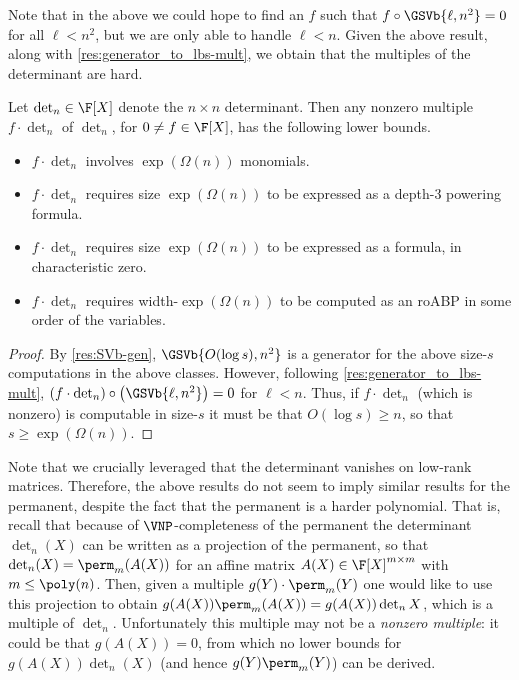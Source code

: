 \documentclass{toc}
\begin{document}
Note that in the above we could hope to find an $f$ such that $f\circ \GSVb{\ell,n^2}=0$ for all $\ell<n^2$, but we are only able to handle $\ell<n$. Given the above result, along with \autoref{res:generator_to_lbs-mult}, we obtain that the multiples of the determinant are hard.

\begin{corollary}\label{res:lbs-mult:pit:det}
        Let $\det_n\in\F[X]$ denote the $n\times n$ determinant.  Then any nonzero multiple $f\cdot \det_n$ of $\det_n$, for $0 \ne f\in\F[X]$, has the following lower bounds.
        \begin{itemize}
                \item $f\cdot \det_n$ involves $\exp(\Omega(n))$ monomials.
                \item $f\cdot \det_n$ requires size $\exp(\Omega(n))$ to be expressed as a depth-$3$ powering formula.
                \item $f\cdot \det_n$ requires size $\exp(\Omega(n))$ to be expressed as a \sumpowc formula, in characteristic zero.
                \item $f\cdot \det_n$ requires width-$\exp(\Omega(n))$ to be computed as an roABP in some order of the variables.
        \end{itemize}
\end{corollary}
\begin{proof}
        By \autoref{res:SVb-gen}, $\GSVb{O(\log s),n^2}$ is a generator for the above size-$s$ computations in the above classes.  However, following \autoref{res:generator_to_lbs-mult}, $(f\cdot\det_n)\circ \left(\GSVb{\ell,n^2}\right)=0$ for $\ell<n$.  Thus, if $f\cdot \det_n$ (which is nonzero) is computable in size-$s$ it must be that $O(\log s)\ge n$, so that $s\ge\exp(\Omega(n))$.
\end{proof}

Note that we crucially leveraged that the determinant vanishes on low-rank matrices.  Therefore, %
the above results do not seem to imply similar results for the permanent, despite the fact that the permanent is a harder polynomial. That is, recall that because of $\VNP$-completeness of the permanent the determinant $\det_n(X)$ can be written as a projection of the permanent, so that $\det_n(X)=\perm_m(A(X))$ for an affine matrix $A(X)\in\F[X]^{m\times m}$ with $m\le \poly(n)$.  Then, given a multiple $g(Y)\cdot\perm_m(Y)$ one would like to use this projection to obtain $g(A(X))\perm_m( A(X))=g(A(X))\det_n X$, which is a multiple of $\det_n$.  Unfortunately this multiple may not be a \emph{nonzero multiple}: it could be that $g(A(X))=0$, from which no lower bounds for $g(A(X))\det_n(X)$ (and hence $g(Y)\perm_m (Y)$) can be derived.
\end{document}
